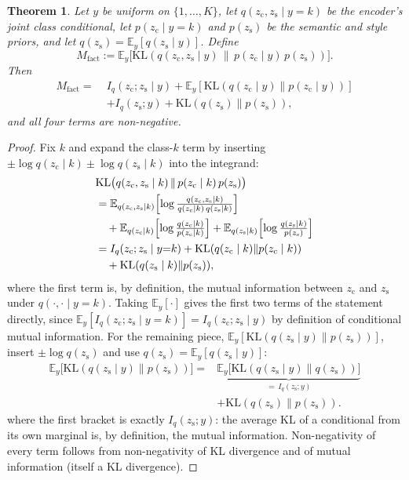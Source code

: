 \documentclass[letterpaper]{article} %
\newtheorem{theorem}{Theorem}
\newcommand{\zc}{z_{\mathrm{c}}}
\newcommand{\zs}{z_{\mathrm{s}}}
\newcommand{\KL}{\mathrm{KL}}
\begin{document}
\begin{theorem}
Let $y$ be uniform on $\{1,\dots,K\}$, let $q(\zc,\zs\mid y{=}k)$ be the
encoder's joint class conditional, let $p(\zc\mid y{=}k)$ and $p(\zs)$ be the
semantic and style priors, and let $q(\zs)=\mathbb E_y[q(\zs\mid y)]$. Define
\[
M_{\mathrm{fact}} := \mathbb E_y\bigl[\KL(q(\zc,\zs\mid y)\,\|\,p(\zc\mid y)\,p(\zs))\bigr].
\]
Then
\begin{align*}
M_{\mathrm{fact}} =\;& I_q(\zc;\zs\mid y)
 + \mathbb E_y[\KL(q(\zc\mid y)\|p(\zc\mid y))]\\
 &+ I_q(\zs;y) + \KL(q(\zs)\|p(\zs)),
\end{align*}
and all four terms are non-negative.
\end{theorem}

\begin{proof}
Fix $k$ and expand the class-$k$ term by inserting $\pm\log q(\zc\mid
k)\pm\log q(\zs\mid k)$ into the integrand:
\begin{align*}
&\KL\bigl(q(\zc,\zs\mid k)\,\|\,p(\zc\mid k)\,p(\zs)\bigr) \\
&= \mathbb E_{q(\zc,\zs\mid k)}\Bigl[\log\tfrac{q(\zc,\zs\mid k)}{q(\zc\mid k)\,q(\zs\mid k)}\Bigr]\\
&\quad + \mathbb E_{q(\zc\mid k)}\Bigl[\log\tfrac{q(\zc\mid k)}{p(\zc\mid k)}\Bigr]
 + \mathbb E_{q(\zs\mid k)}\Bigl[\log\tfrac{q(\zs\mid k)}{p(\zs)}\Bigr] \\
&= I_q(\zc;\zs\mid y{=}k) + \KL(q(\zc\mid k)\|p(\zc\mid k))\\
&\quad + \KL(q(\zs\mid k)\|p(\zs)),
\end{align*}
where the first term is, by definition, the mutual information between $\zc$
and $\zs$ under $q(\cdot,\cdot\mid y{=}k)$. Taking $\mathbb E_y[\cdot]$ gives
the first two terms of the statement directly, since $\mathbb
E_y[I_q(\zc;\zs\mid y{=}k)]=I_q(\zc;\zs\mid y)$ by definition of conditional
mutual information. For the remaining piece, $\mathbb E_y[\KL(q(\zs\mid
y)\|p(\zs))]$, insert $\pm\log q(\zs)$ and use $q(\zs)=\mathbb E_y[q(\zs\mid
y)]$:
\begin{align*}
\mathbb E_y\bigl[\KL(q(\zs\mid y)\|p(\zs))\bigr]
={}& \underbrace{\mathbb E_y\bigl[\KL(q(\zs\mid y)\|q(\zs))\bigr]}_{=\,I_q(\zs;y)}\\
&+ \KL(q(\zs)\|p(\zs)).
\end{align*}
where the first bracket is exactly $I_q(\zs;y)$: the average KL of a
conditional from its own marginal is, by definition, the mutual information.
Non-negativity of every term follows from non-negativity of KL divergence and
of mutual information (itself a KL divergence).
\end{proof}
\end{document}
